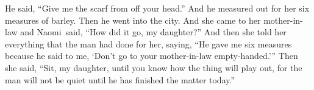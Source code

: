 \begin{inparaenum}
     He said, ``Give me the scarf from off your head.'' And he measured out for her six measures of barley. Then he went into the city.%
     And she came to her mother-in-law and Naomi\understood\ said, ``How did it go, my daughter?'' And then she told her everything that the man had done for her,%
     saying, ``He gave me six measures because he said to me, `Don't go to your mother-in-law empty-handed.'\thinspace''%
     Then she said, ``Sit, my daughter, until you know how the thing will play out, for the man will not be quiet until he has finished the matter today.''%
\end{inparaenum}
